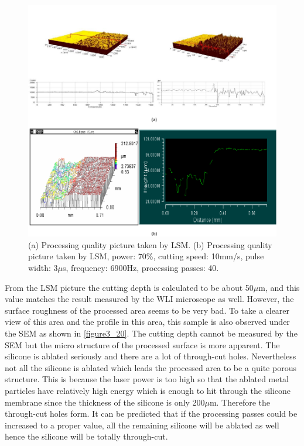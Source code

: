 \begin{figure}[ht]%
\centering
\includegraphics[width=1\textwidth]{figures/designandfabrication/figure3_19}%
\caption{(a) Processing quality picture taken by LSM. (b) Processing quality picture taken by LSM, power: 70\%, cutting speed: 10mm/s, pulse width: 3$\mu$s, frequency: 6900Hz, processing passes: 40.}%
\label{figure3_19}%
\end{figure}

From the LSM picture the cutting depth is calculated to be about 50$\mu$m, and this value matches the result measured by the WLI microscope as well. However, the surface roughness of the processed area seems to be very bad. To take a clearer view of this area and the profile in this area, this sample is also observed under the SEM as shown in \autoref{figure3_20}. The cutting depth cannot be measured by the SEM but the micro structure of the processed surface is more apparent. The silicone is ablated seriously and there are a lot of through-cut holes. Nevertheless not all the silicone is ablated which leads the processed area to be a quite porous structure. This is because the laser power is too high so that the ablated metal particles have relatively high energy which is enough to hit through the silicone membrane since the thickness of the silicone is only 200$\mu$m. Therefore the through-cut holes form. It can be predicted that if the processing passes could be increased to a proper value, all the remaining silicone will be ablated as well hence the silicone will be totally through-cut.\\

